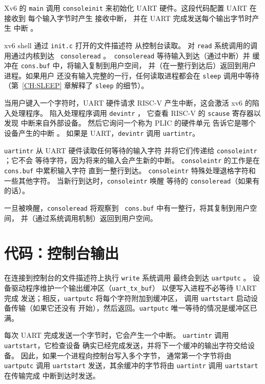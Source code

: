 Xv6 的 {\tt main} 调用 {\tt consoleinit}
 来初始化 UART
硬件。这段代码配置 UART 在接收到
每个输入字节时产生
接收中断，
并在 UART 完成发送每个输出字节时产生
中断 。

xv6 shell 通过 {\tt init.c} 打开的文件描述符
 从控制台读取。
对 {\tt read} 系统调用的调用通过内核到达 {\tt
  consoleread} 。{\tt
  consoleread} 等待输入到达（通过中断）并
缓冲在 {\tt cons.buf} 中，将输入复制到用户空间，
并（在一整行到达后）返回到用户进程。如果用户
还没有输入完整的一行，任何读取进程都会在
{\tt sleep} 调用中等待
（第~\ref{CH:SLEEP} 章解释了 {\tt sleep} 的细节）。

当用户键入一个字符时，UART 硬件请求 RISC-V
产生中断，这会激活
xv6 的陷入处理程序。
陷入处理程序调用 {\tt devintr}
，
它查看 RISC-V 的 {\tt scause} 寄存器以发现
中断来自外部设备。
然后它询问一个称为 PLIC 的硬件单元
\cite{riscv:priv}
告诉它是哪个设备产生的中断
。
如果是 UART，{\tt devintr} 调用 {\tt uartintr}。

{\tt uartintr}
从 UART 硬件读取任何等待的输入字符
并将它们传递给 {\tt consoleintr}
；它不会
等待字符，因为将来的输入会产生新的中断。
{\tt consoleintr} 的工作是在
{\tt cons.buf} 中累积输入字符
直到一整行到达。
{\tt consoleintr} 特殊处理退格字符和一些其他字符。
当新行到达时，{\tt consoleintr} 唤醒
等待的 {\tt consoleread}（如果有的话）。

一旦被唤醒，{\tt consoleread} 将观察到 {\tt
  cons.buf} 中有一整行，将其复制到用户空间，
并（通过系统调用机制）返回到用户空间。

\section{代码：控制台输出}

在连接到控制台的文件描述符上执行 {\tt write} 系统调用
最终会到达
{\tt uartputc}
。
设备驱动程序维护一个输出缓冲区（{\tt uart\_tx\_buf}）
以便写入进程不必等待 UART 完成
发送；相反，{\tt uartputc} 将每个字符附加到缓冲区，
调用 {\tt uartstart} 启动设备传输（如果它还没有
开始），然后返回。{\tt uartputc}
唯一等待的情况是缓冲区已满。

每次 UART 完成发送一个字节时，它会产生一个中断。
{\tt uartintr} 调用 {\tt uartstart}，它检查设备
确实已经完成发送，并将下一个缓冲的输出字符交给设备。
因此，如果一个进程向控制台写入多个字节，
通常第一个字节将由 {\tt uartputc} 调用
{\tt uartstart} 发送，其余缓冲的字节将由
{\tt uartintr} 调用 {\tt uartstart} 在传输完成
中断到达时发送。

